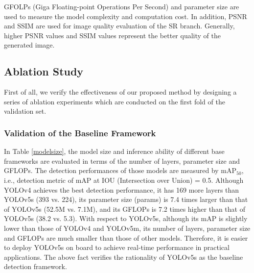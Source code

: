 GFOLPs (Giga Floating-point Operations Per Second) and parameter size are used to measure the model complexity and computation cost. In addition, PSNR and SSIM are used for image quality evaluation of the SR branch. Generally, higher PSNR values and SSIM values represent the better quality of the generated image.



\subsection{Ablation Study}
\label{sec: Ablation Study}

First of all, we verify the effectiveness of our proposed method by designing a series of ablation experiments which are conducted on the first fold of the validation set.





\subsubsection{\textbf{Validation of the Baseline Framework}} 
In Table \ref{modelsize}, the model size and inference ability of different base frameworks are evaluated in terms of the number of layers, parameter size and GFLOPs. The detection performances of those models are measured by $\text{mA}{{\text{P}}_{\text{50}}}$, i.e., detection metric of mAP at IOU (Intersection over Union) = 0.5. Although YOLOv4 achieves the best detection performance, it has 169 more layers than YOLOv5s (393 vs. 224), its parameter size (params) is 7.4 times larger than that of YOLOv5s (52.5M vs. 7.1M), and its GFLOPs is 7.2 times higher than that of YOLOv5s (38.2 vs. 5.3). With respect to YOLOv5s, although its mAP is slightly lower than those of YOLOv4 and YOLOv5m, its number of layers, parameter size and GFLOPs are much smaller than those of other models. Therefore, it is easier to deploy YOLOv5s on board to achieve real-time performance in practical applications. The above fact verifies the rationality of YOLOv5s as the baseline detection framework.



